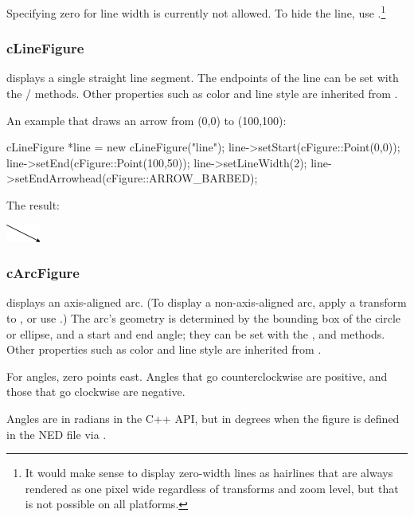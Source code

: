 Specifying zero for line width is currently not allowed. To hide the line,
use .\footnote{It would make sense to display
zero-width lines as hairlines that are always rendered as one pixel wide
regardless of transforms and zoom level, but that is not possible on all
platforms.}


\subsubsection{cLineFigure}

 displays a single straight line segment. The endpoints
of the line can be set with the /
methods. Other properties such as color and line style are inherited from
.

An example that draws an arrow from (0,0) to (100,100):

\begin{cpp}
cLineFigure *line = new cLineFigure("line");
line->setStart(cFigure::Point(0,0));
line->setEnd(cFigure::Point(100,50));
line->setLineWidth(2);
line->setEndArrowhead(cFigure::ARROW_BARBED);
\end{cpp}

The result:

\begin{center}
\includegraphics[scale=4.0]{figures/figure-line}
\end{center}


\subsubsection{cArcFigure}

 displays an axis-aligned arc. (To display a
non-axis-aligned arc, apply a transform to , or use
.) The arc's geometry is determined by the bounding box
of the circle or ellipse, and a start and end angle; they can be set with
the ,  and 
methods. Other properties such as color and line style are inherited from
.

For angles, zero points east. Angles that go counterclockwise are
positive, and those that go clockwise are negative.

\begin{note}
Angles are in radians in the C++ API, but in degrees when the figure is
defined in the NED file via .
\end{note}

